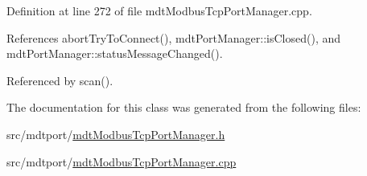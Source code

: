 Definition at line 272 of file mdt\-Modbus\-Tcp\-Port\-Manager.\-cpp.



References abort\-Try\-To\-Connect(), mdt\-Port\-Manager\-::is\-Closed(), and mdt\-Port\-Manager\-::status\-Message\-Changed().



Referenced by scan().



The documentation for this class was generated from the following files\-:\begin{DoxyCompactItemize}
\item 
src/mdtport/\hyperlink{mdt_modbus_tcp_port_manager_8h}{mdt\-Modbus\-Tcp\-Port\-Manager.\-h}\item 
src/mdtport/\hyperlink{mdt_modbus_tcp_port_manager_8cpp}{mdt\-Modbus\-Tcp\-Port\-Manager.\-cpp}\end{DoxyCompactItemize}
